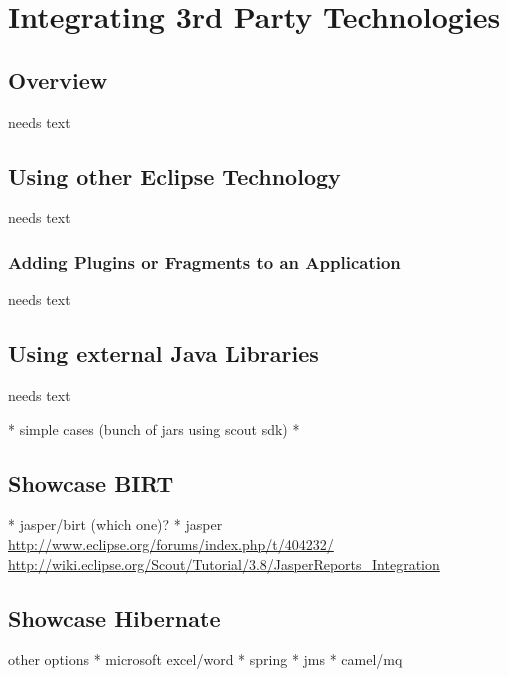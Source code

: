 \documentclass[a4paper,10pt,twoside]{book}
\begin{document}
  \sloppy
\fi


\chapter{Integrating 3rd Party Technologies}

\section{Overview}
needs text

\section{Using other Eclipse Technology}
needs text

\subsection{Adding Plugins or Fragments to an Application}
needs text

\section{Using external Java Libraries}
needs text

  * simple cases (bunch of jars using scout sdk)
  * 
  
\section{Showcase BIRT}
  * jasper/birt (which one)?
  * jasper \url{http://www.eclipse.org/forums/index.php/t/404232/} 
   \url{http://wiki.eclipse.org/Scout/Tutorial/3.8/JasperReports_Integration}
  
\section{Showcase Hibernate}  

other options
  * microsoft excel/word
  * spring
  * jms
  * camel/mq
 
 
\ifx\wholebook\relax\else
   
   
\end{document}
